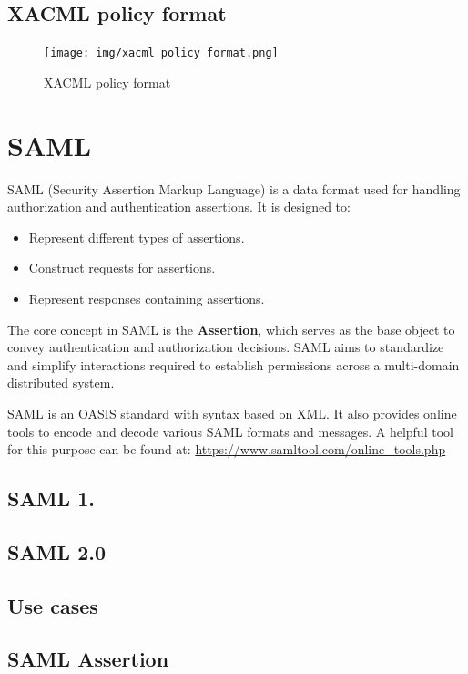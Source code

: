 \subsection{XACML policy format}

\begin{figure}[H]
  \centering
  \texttt{[image: img/xacml policy
  format.png]}
  \caption{XACML policy format}
\end{figure}


\section{SAML}

SAML (Security Assertion Markup Language) is a data format used for
handling authorization and authentication assertions. It is designed
to:

\begin{itemize}
  \item Represent different types of assertions.
  \item Construct requests for assertions.
  \item Represent responses containing assertions.
\end{itemize}

The core concept in SAML is the \textbf{Assertion}, which serves as
the base object to convey authentication and authorization decisions.
SAML aims to standardize and simplify interactions required to
establish permissions across a multi-domain distributed system.

SAML is an OASIS standard with syntax based on XML. It also provides
online tools to encode and decode various SAML formats and messages. A
helpful tool for this purpose can be found at:
\url{https://www.samltool.com/online_tools.php}

\subsection{SAML 1.\*}

\subsection{SAML 2.0}

\subsection{Use cases}

\subsection{SAML Assertion}

